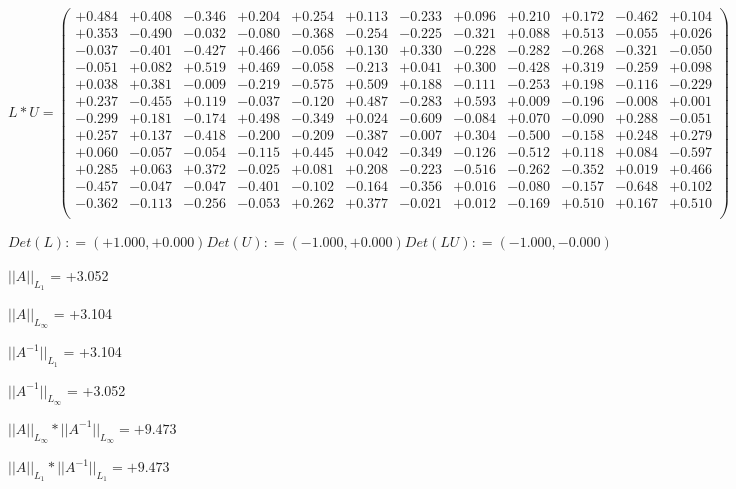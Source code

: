 \documentclass[9pt]{article}
\theoremstyle{plain}
\theoremstyle{definition}
\theoremstyle{remark}
\numberwithin{equation}{section}
\begin{document}
$L * U  = \left(
\begin{array}{
cccccccccccc}
+0.484 & +0.408 & -0.346 & +0.204 & +0.254 & +0.113 & -0.233 & +0.096 & +0.210 & +0.172 & -0.462 & +0.104 \\
+0.353 & -0.490 & -0.032 & -0.080 & -0.368 & -0.254 & -0.225 & -0.321 & +0.088 & +0.513 & -0.055 & +0.026 \\
-0.037 & -0.401 & -0.427 & +0.466 & -0.056 & +0.130 & +0.330 & -0.228 & -0.282 & -0.268 & -0.321 & -0.050 \\
-0.051 & +0.082 & +0.519 & +0.469 & -0.058 & -0.213 & +0.041 & +0.300 & -0.428 & +0.319 & -0.259 & +0.098 \\
+0.038 & +0.381 & -0.009 & -0.219 & -0.575 & +0.509 & +0.188 & -0.111 & -0.253 & +0.198 & -0.116 & -0.229 \\
+0.237 & -0.455 & +0.119 & -0.037 & -0.120 & +0.487 & -0.283 & +0.593 & +0.009 & -0.196 & -0.008 & +0.001 \\
-0.299 & +0.181 & -0.174 & +0.498 & -0.349 & +0.024 & -0.609 & -0.084 & +0.070 & -0.090 & +0.288 & -0.051 \\
+0.257 & +0.137 & -0.418 & -0.200 & -0.209 & -0.387 & -0.007 & +0.304 & -0.500 & -0.158 & +0.248 & +0.279 \\
+0.060 & -0.057 & -0.054 & -0.115 & +0.445 & +0.042 & -0.349 & -0.126 & -0.512 & +0.118 & +0.084 & -0.597 \\
+0.285 & +0.063 & +0.372 & -0.025 & +0.081 & +0.208 & -0.223 & -0.516 & -0.262 & -0.352 & +0.019 & +0.466 \\
-0.457 & -0.047 & -0.047 & -0.401 & -0.102 & -0.164 & -0.356 & +0.016 & -0.080 & -0.157 & -0.648 & +0.102 \\
-0.362 & -0.113 & -0.256 & -0.053 & +0.262 & +0.377 & -0.021 & +0.012 & -0.169 & +0.510 & +0.167 & +0.510 \\
\end{array}
\right)$ \newline 

$Det(L) :    = (+1.000,+0.000)     Det(U) :    = (-1.000,+0.000)     Det(LU) :    = (-1.000,-0.000)$

$||A||_{L_1}$  = +3.052

$||A||_{L_{\infty}}$ = +3.104

$||A^{-1}||_{L_1}$  = +3.104

$||A^{-1}||_{L_{\infty}}$ = +3.052

$||A||_{L_{\infty}} * ||A^{-1}||_{L_{\infty}} = +9.473$

$||A||_{L_1} * ||A^{-1}||_{L_1} = +9.473$
\end{document}
